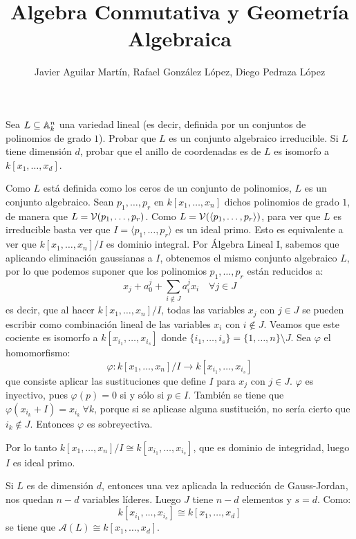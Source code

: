 \documentclass[twoside]{article}
\begin{document}
\title{Algebra Conmutativa y Geometría Algebraica}
\author{Javier Aguilar Martín, Rafael González López, Diego Pedraza López}
\maketitle
\begin{ejercicio}{1}
Sea $L \subseteq \mathbb{A}_k^n$ una variedad lineal (es decir, definida por un conjuntos de polinomios de grado $1$). Probar que $L$ es un conjunto algebraico irreducible. Si $L$ tiene dimensión $d$, probar que el anillo de coordenadas es de $L$ es isomorfo a $k[x_1,\dots,x_d]$.
\end{ejercicio}

\begin{sol}
Como $L$ está definida como los ceros de un conjunto de polinomios, $L$ es un conjunto algebraico. Sean $p_1,\dots,p_r$ en $k[x_1,\dots,x_n]$ dichos polinomios de grado $1$, de manera que $L=\mathcal{V}(p_1,\dots,p_r)$. Como $L=\mathcal{V}(\langle p_1,\dots,p_r\rangle)$, para ver que $L$ es irreducible basta ver que $I=\langle p_1,\dots,p_r\rangle$ es un ideal primo. Esto es equivalente a ver que $k[x_1,\dots,x_n]/I$ es dominio integral. Por Álgebra Lineal I, sabemos que aplicando eliminación gaussianas a $I$, obtenemos el mismo conjunto algebraico $L$, por lo que podemos suponer que los polinomios $p_1,\dots,p_r$ están reducidos a:
\[ x_j + a_0^j + \sum_{i\notin J}a_i^j x_i \quad \forall j \in J \]
es decir, que al hacer $k[x_1,\dots,x_n]/I$, todas las variables $x_j$ con $j\in J$ se pueden escribir como combinación lineal de las variables $x_i$ con $i \notin J$. Veamos que este cociente es isomorfo a $k[x_{i_1},\dots,x_{i_s}]$ donde $\{i_1,\dots,i_s\}=\{1,\dots,n\}\setminus J$. Sea $φ$ el homomorfismo:
\[ φ : k[x_1,\dots,x_n]/I \to k[x_{i_1},\dots,x_{i_s}] \]
que consiste aplicar las sustituciones que define $I$ para $x_j$ con $j \in J$. $φ$ es inyectivo, pues $φ(p) = 0$ si y sólo si $p \in I$. También se tiene que $φ(x_{i_k}+I)=x_{i_k} \ \forall k$, porque si se aplicase alguna sustitución, no sería cierto que $i_k \notin J$. Entonces $φ$ es sobreyectiva.

Por lo tanto $k[x_1,\dots,x_n]/I \cong k[x_{i_1},\dots,x_{i_s}]$, que es dominio de integridad, luego $I$ es ideal primo.

Si $L$ es de dimensión $d$, entonces una vez aplicada la reducción de Gauss-Jordan, nos quedan $n-d$ variables líderes. Luego $J$ tiene $n-d$ elementos y $s = d$. Como:
\[ k[x_{i_1},\dots,x_{i_s}] \cong k[x_1,\dots,x_d] \]
se tiene que $\mathcal{A}(L) \cong k[x_1,\dots,x_d]$.
\end{sol}
\end{document}

